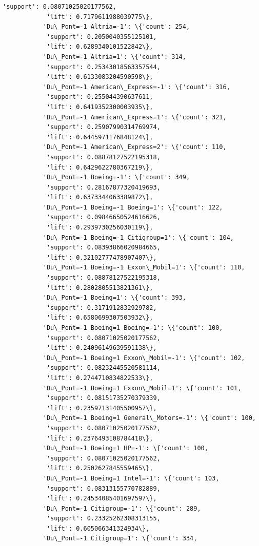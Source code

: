 \documentclass[11pt]{article}
\begin{document}
\begin{Verbatim}[commandchars=\\\{\}]
            'support': 0.08071025020177562,
            'lift': 0.7179611988039775\},
           'Du\_Pont=-1 Altria=-1': \{'count': 254,
            'support': 0.2050040355125101,
            'lift': 0.6289340101522842\},
           'Du\_Pont=-1 Altria=1': \{'count': 314,
            'support': 0.25343018563357544,
            'lift': 0.6133083204590598\},
           'Du\_Pont=-1 American\_Express=-1': \{'count': 316,
            'support': 0.255044390637611,
            'lift': 0.6419352300003935\},
           'Du\_Pont=-1 American\_Express=1': \{'count': 321,
            'support': 0.25907990314769974,
            'lift': 0.6445971176848124\},
           'Du\_Pont=-1 American\_Express=2': \{'count': 110,
            'support': 0.08878127522195318,
            'lift': 0.6429622780367219\},
           'Du\_Pont=-1 Boeing=-1': \{'count': 349,
            'support': 0.28167877320419693,
            'lift': 0.6373344063389872\},
           'Du\_Pont=-1 Boeing=-1 Boeing=1': \{'count': 122,
            'support': 0.09846650524616626,
            'lift': 0.2939730256030119\},
           'Du\_Pont=-1 Boeing=-1 Citigroup=1': \{'count': 104,
            'support': 0.08393866020984665,
            'lift': 0.32102777478907407\},
           'Du\_Pont=-1 Boeing=-1 Exxon\_Mobil=1': \{'count': 110,
            'support': 0.08878127522195318,
            'lift': 0.2802805513821361\},
           'Du\_Pont=-1 Boeing=1': \{'count': 393,
            'support': 0.3171912832929782,
            'lift': 0.6580699307503932\},
           'Du\_Pont=-1 Boeing=1 Boeing=-1': \{'count': 100,
            'support': 0.08071025020177562,
            'lift': 0.24096149639591138\},
           'Du\_Pont=-1 Boeing=1 Exxon\_Mobil=-1': \{'count': 102,
            'support': 0.08232445520581114,
            'lift': 0.2744710834822533\},
           'Du\_Pont=-1 Boeing=1 Exxon\_Mobil=1': \{'count': 101,
            'support': 0.08151735270379339,
            'lift': 0.23597131405500957\},
           'Du\_Pont=-1 Boeing=1 General\_Motors=-1': \{'count': 100,
            'support': 0.08071025020177562,
            'lift': 0.2376493108784418\},
           'Du\_Pont=-1 Boeing=1 HP=-1': \{'count': 100,
            'support': 0.08071025020177562,
            'lift': 0.2502627845559465\},
           'Du\_Pont=-1 Boeing=1 Intel=-1': \{'count': 103,
            'support': 0.08313155770782889,
            'lift': 0.24534085401697597\},
           'Du\_Pont=-1 Citigroup=-1': \{'count': 289,
            'support': 0.23325262308313155,
            'lift': 0.605066341324934\},
           'Du\_Pont=-1 Citigroup=1': \{'count': 334,

\end{Verbatim}
\end{document}
